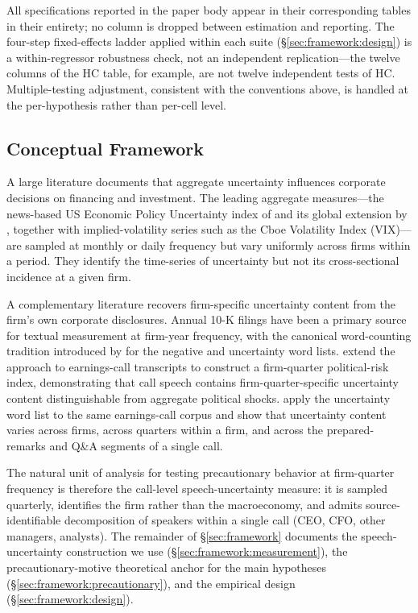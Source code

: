 All specifications reported in the paper body appear in their corresponding tables in their entirety; no column is dropped between estimation and reporting. The four-step fixed-effects ladder applied within each suite (\S\ref{sec:framework:design}) is a within-regressor robustness check, not an independent replication---the twelve columns of the HC table, for example, are not twelve independent tests of HC. Multiple-testing adjustment, consistent with the conventions above, is handled at the per-hypothesis rather than per-cell level.

\subsection{Conceptual Framework}
\label{sec:framework:conceptual}

A large literature documents that aggregate uncertainty influences corporate decisions on financing and investment. The leading aggregate measures---the news-based US Economic Policy Uncertainty index of  and its global extension by , together with implied-volatility series such as the Cboe Volatility Index (VIX)---are sampled at monthly or daily frequency but vary uniformly across firms within a period. They identify the time-series of uncertainty but not its cross-sectional incidence at a given firm.

A complementary literature recovers firm-specific uncertainty content from the firm's own corporate disclosures. Annual 10-K filings have been a primary source for textual measurement at firm-year frequency, with the canonical word-counting tradition introduced by  for the negative and uncertainty word lists.  extend the approach to earnings-call transcripts to construct a firm-quarter political-risk index, demonstrating that call speech contains firm-quarter-specific uncertainty content distinguishable from aggregate political shocks.  apply the  uncertainty word list to the same earnings-call corpus and show that uncertainty content varies across firms, across quarters within a firm, and across the prepared-remarks and Q\&A segments of a single call.

The natural unit of analysis for testing precautionary behavior at firm-quarter frequency is therefore the call-level speech-uncertainty measure: it is sampled quarterly, identifies the firm rather than the macroeconomy, and admits source-identifiable decomposition of speakers within a single call (CEO, CFO, other managers, analysts). The remainder of \S\ref{sec:framework} documents the speech-uncertainty construction we use (\S\ref{sec:framework:measurement}), the precautionary-motive theoretical anchor for the main hypotheses (\S\ref{sec:framework:precautionary}), and the empirical design (\S\ref{sec:framework:design}).

